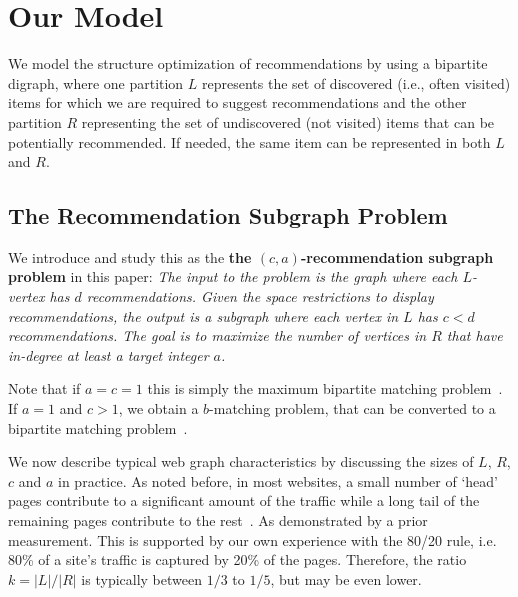 \section{Our Model}

We model the structure optimization of recommendations by using a bipartite
digraph, where one partition $L$ represents the set of discovered
(i.e., often visited) items for which we are required to suggest recommendations and the other partition $R$
representing the set of undiscovered (not visited) items that can be potentially recommended. If
needed, the same item can be represented in both $L$ and $R$.
\vs

\subsection{The Recommendation Subgraph Problem}
We introduce and study this as the {\bf the $(c, a)$-recommendation subgraph problem} in this paper:
{\em
 The input to the problem is the graph where each
$L$-vertex has $d$ recommendations. Given the space restrictions to
display recommendations, the output is a subgraph where each vertex in
$L$ has $c < d$ recommendations. The goal is to maximize the number of
vertices in $R$ that have in-degree at least a target integer $a$.
}

\vs

Note that if $a=c=1$ this is simply the maximum bipartite
matching problem~\cite{LovaszPlummer1986}. If $a=1$ and $c > 1$, we
obtain a $b$-matching problem, that can be converted to a bipartite
matching problem~\cite{Gabow1983}.\vs


We now describe typical web graph characteristics by discussing the
sizes of $L$, $R$, $c$ and $a$ in practice. As noted before, in most
websites, a small number of `head' pages contribute to a significant
amount of the traffic while a long tail of the remaining pages
contribute to the rest~\cite{HubermanAdamic1999,
  DuDemmerBrewer2006, KumarNorrisSun2009}. As demonstrated by a prior
measurement. This is supported by our
own experience with the 80/20 rule, i.e. 80\% of a site's traffic is
captured by 20\% of the pages. Therefore, the ratio $k=|L|/|R|$ is
typically between $1/3$ to $1/5$, but may be even lower. \vs

